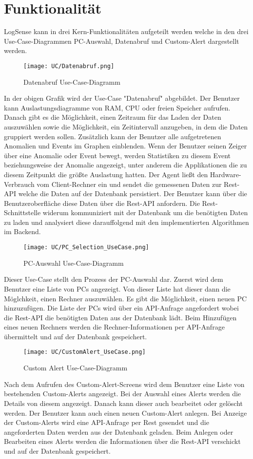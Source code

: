 \documentclass{report}
\begin{document}
\section{Funktionalität}
LogSense kann in drei Kern-Funktionalitäten aufgeteilt werden welche in den drei Use-Case-Diagrammen PC-Auswahl, Datenabruf und Custom-Alert dargestellt werden.
\begin{figure}[H]
    \centering
    \texttt{[image: UC/Datenabruf.png]}
    \caption{Datenabruf Use-Case-Diagramm}
\end{figure}
In der obigen Grafik wird der Use-Case "Datenabruf" abgebildet. Der Benutzer kann Auslastungsdiagramme von RAM, CPU oder freien Speicher aufrufen. Danach gibt es die Möglichkeit, einen Zeitraum für das Laden der Daten auszuwählen sowie die Möglichkeit, ein Zeitintervall anzugeben, in dem die Daten gruppiert werden sollen. Zusätzlich kann der Benutzer alle aufgetretenen Anomalien und Events im Graphen einblenden. Wenn der Benutzer seinen Zeiger über eine Anomalie oder Event bewegt, werden Statistiken zu diesem Event beziehungsweise der Anomalie angezeigt, unter anderem die Applikationen die zu diesem Zeitpunkt die größte Auslastung hatten. Der Agent ließt den Hardware-Verbrauch vom Client-Rechner ein und sendet die gemessenen Daten zur Rest-API welche die Daten auf der Datenbank persistiert. Der Benutzer kann über die Benutzeroberfläche diese Daten über die Rest-API anfordern. Die Rest-Schnittstelle widerum kommuniziert mit der Datenbank um die benötigten Daten zu laden und analysiert diese darauffolgend mit den implementierten Algorithmen im Backend. 
\begin{figure}[H]
    \centering
    \texttt{[image: UC/PC\_Selection\_UseCase.png]}
    \caption{PC-Auswahl Use-Case-Diagramm}
\end{figure}
Dieser Use-Case stellt den Prozess der PC-Auswahl dar. Zuerst wird dem Benutzer eine Liste von PCs angezeigt. Von dieser Liste hat dieser dann die Möglchkeit, einen Rechner auszuwählen. Es gibt die Möglichkeit, einen neuen PC hinzuzufügen. Die Liste der PCs wird über ein API-Anfrage angefordert wobei die Rest-API die benötigten Daten aus der Datenbank lädt. Beim Hinzufügen eines neuen Rechners werden die Rechner-Informationen per API-Anfrage übermittelt und auf der Datenbank gespeichert.
\begin{figure}[H]
    \centering
    \texttt{[image: UC/CustomAlert\_UseCase.png]}
    \caption{Custom Alert Use-Case-Diagramm}
\end{figure}
Nach dem Aufrufen des Custom-Alert-Screens wird dem Benutzer eine Liste von bestehenden Custom-Alerts angezeigt. Bei der Auswahl eines Alerts werden die Details von diesem angezeigt. Danach kann dieser auch bearbeitet oder gelöscht werden. Der Benutzer kann auch einen neuen Custom-Alert anlegen. Bei Anzeige der Custom-Alerts wird eine API-Anfrage per Rest gesendet und die angeforderten Daten werden aus der Datenbank geladen. Beim Anlegen oder Bearbeiten eines Alerts werden die Informationen über die Rest-API verschickt und auf der Datenbank gespeichert. 
\end{document}

